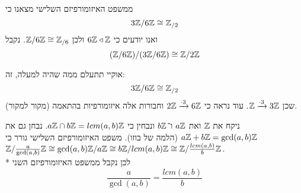 \begin{remark}[תזכורת]
	ממשפט האיזומורפיזם השלישי מצאנו כי
	\[
		3\mathbb{Z} / 6\mathbb{Z} \cong \mathbb{Z}_{/2}
	\]
	ואנו יודעים כי $6\mathbb{Z} \triangleleft \mathbb{Z}$ ולכן $\mathbb{Z} / 6\mathbb{Z} \cong \mathbb{Z}_{/6}$.
	נקבל
	\[
		(\mathbb{Z} / 6 \mathbb{Z}) / (3\mathbb{Z} / 6\mathbb{Z}) \cong \mathbb{Z} / 2\mathbb{Z}
	\]

	אוקיי תתעלם ממה שהיה למעלה, זה:
	\[
		3\mathbb{Z} / 6\mathbb{Z} \cong \mathbb{Z}_{/2}
	\]
	שכן $\mathbb{Z} \xrightarrow{\cdot 3} 3\mathbb{Z}$. עוד נראה כי $2\mathbb{Z} \xrightarrow{\cdot 3} 6\mathbb{Z}$ וחבורות אלה איזומורפיות בהתאמה (מקור למקור).
\end{remark}
\begin{example}
	ניקח את $\mathbb{Z}$ ואת $a \mathbb{Z}$ ו־$b \mathbb{Z}$ ונבחין כי $a\mathbb{Z} \cap b\mathbb{Z} = lcm(a, b) \mathbb{Z}$.
	נבחן גם את $a\mathbb{Z} + b\mathbb{Z} = \gcd(a, b) \mathbb{Z}$ (הלמה של בוזו).
	משפט האיזומורפיזם השלישי גורר כי $\mathbb{Z} / \frac{a}{\gcd(a, b)}\mathbb{Z} \cong \gcd(a, b) \mathbb{Z} / a\mathbb{Z} \cong b\mathbb{Z} / lcm(a, b) \mathbb{Z} \cong \mathbb{Z} / \frac{lcm(a, b)}{b} \mathbb{Z}$. \\*
	לכן נקבל ממשפט האיזומורפיזם השני
	\[
		\frac{a}{\gcd(a, b)} = \frac{lcm(a, b)}{b}
	\]
\end{example}

